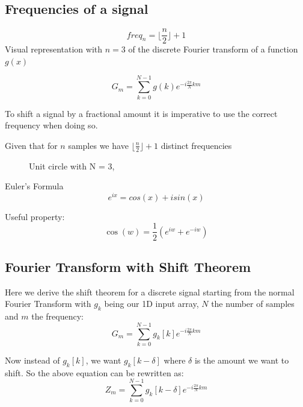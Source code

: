 \documentclass[]{usiinfbachelorproject}
\begin{document}
	\subsection{Frequencies of a signal}
	\begin{equation}
		freq_{n} = \lfloor \frac{n}{2} \rfloor + 1 \label{freq_equation}
	\end{equation}
	Visual representation with $n=3$ of the discrete Fourier transform of a function $g(x)$
	
	\begin{equation*}
		G_m = \displaystyle\sum_{k=0}^{N-1}g(k)e^{-i \frac{2\pi}{N}km}
	\end{equation*}
	
	To shift a signal by a fractional amount it is imperative to use the correct frequency when doing so.
	
	Given that for $n$ samples we have $\lfloor \frac{n}{2} \rfloor + 1$ distinct frequencies
	
	
	\begin{figure}
		\centering
		
		\caption{Unit circle with N = 3, }
	\end{figure}
	
	Euler's Formula
	\begin{equation}
		e^{ix} = cos(x)  + i sin(x)
	\end{equation}
	
	Useful property:
	\begin{equation}
		\cos(w)= \frac{1}{2}(e^{iw}+ e^{-iw})
	\end{equation}
	
	
	\subsection{Fourier Transform with Shift Theorem}
	Here we derive the shift theorem for a discrete signal starting from the normal Fourier Transform with $g_k$ being our 1D input array, $N$ the number of samples and $m$ the frequency:
	\begin{equation*}
		G_m = \displaystyle\sum_{k=0}^{N-1}g_k[k]e^{-i \frac{2\pi}{N} km}
	\end{equation*}
	
	Now instead of $g_k[k]$, we want $g_k[k - \delta]$ where $\delta$ is the amount we want to shift.
	So the above equation can be rewritten as:
	\begin{equation*}
		Z_m = \displaystyle\sum_{k=0}^{N-1}g_k[k - \delta]e^{-i \frac{2\pi}{N} km}
	\end{equation*}
	
\end{document}

